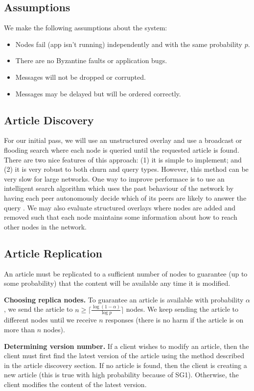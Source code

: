 \documentclass{article}
\begin{document}
\subsection{Assumptions}
We make the following assumptions about the system:
\begin{itemize}
  \item Nodes fail (app isn’t running) independently and with the same probability $p$.
  \item There are no Byzantine faults or application bugs.
  \item Messages will not be dropped or corrupted.
  \item Messages may be delayed but will be ordered correctly.
\end{itemize}

\subsection{Article Discovery}
For our initial pass, we will use an unstructured overlay and use a broadcast or
flooding search where each node is queried until the requested article is found. There are
two nice features of this approach: (1) it is simple to implement; and (2) it is
very robust to both churn and query types. However, this method can be very slow
for large networks. One way to improve performace is to use an intelligent search
algorithm which uses the past behaviour of the network by having each peer
autonomously decide which of its peers are likely to answer the query \cite{kgz02}.
We may also evaluate structured overlays where nodes are added and removed such
that each node maintains some information about how to reach other nodes in the
network.

\subsection{Article Replication}
An article must be replicated to a sufficient number of nodes to guarantee (up to
some probability) that the content will be available any time it is modified.

\textbf{Choosing replica nodes.} To guarantee an article is available with probability
$\alpha$, we send the article to $n \geq \lceil \frac{\log{(1-\alpha)}}{\log{p}} \rceil$
 nodes. We keep sending the article to different nodes until we receive $n$ responses
 (there is no harm if the article is on more than $n$ nodes).

\textbf{Determining version number.} If a client wishes to modify an article,
then the client must first find the latest version of the article using the method
described in the article discovery section. If no article is found, then the client
is creating a new article (this is true with high probability because of SG1).
Otherwise, the client modifies the content of the latest version.
\end{document}
